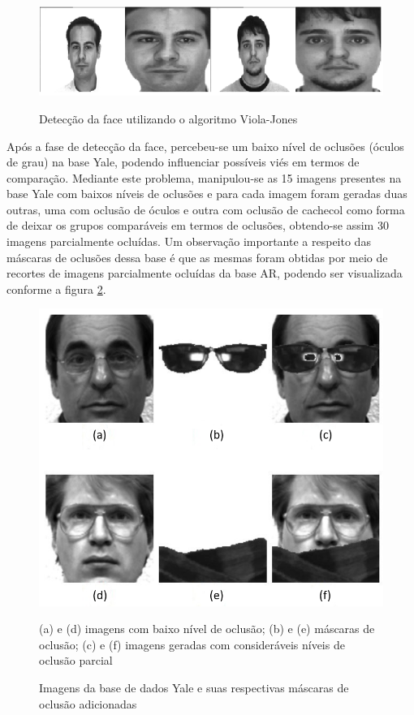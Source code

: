 \begin{figure}[H]
\centering
\caption{Detecção da face utilizando o algoritmo Viola-Jones}
\includegraphics[scale=0.99]{imgs/violap.png}
\label{fig:aplic_viola_jones}
\end{figure}

Após a fase de detecção da face, percebeu-se um baixo nível de oclusões (óculos de grau) na base Yale, podendo influenciar possíveis viés em termos de comparação. Mediante este problema, manipulou-se as 15 imagens presentes na base Yale com baixos níveis de oclusões e para cada imagem foram geradas duas outras, uma com oclusão de óculos e outra com oclusão de cachecol como forma de deixar os grupos comparáveis em termos de oclusões, obtendo-se assim 30 imagens parcialmente ocluídas. Um observação importante a respeito das máscaras de oclusões dessa base é que as mesmas foram obtidas por meio de recortes de imagens parcialmente ocluídas da base AR, podendo ser visualizada conforme a figura \ref{fig:mascaras}.


\begin{figure}[H]
\centering
\caption{Imagens da base de dados Yale e suas respectivas máscaras de oclusão adicionadas}
\label{fig:mascaras}
\includegraphics[scale=0.45]{imgs/pre_proce.png}
\begin{fignote} 
(a) e (d) imagens com baixo nível de oclusão; (b) e (e) máscaras de oclusão; (c) e (f) imagens geradas com consideráveis níveis de oclusão parcial  
\end{fignote}
\end{figure}

